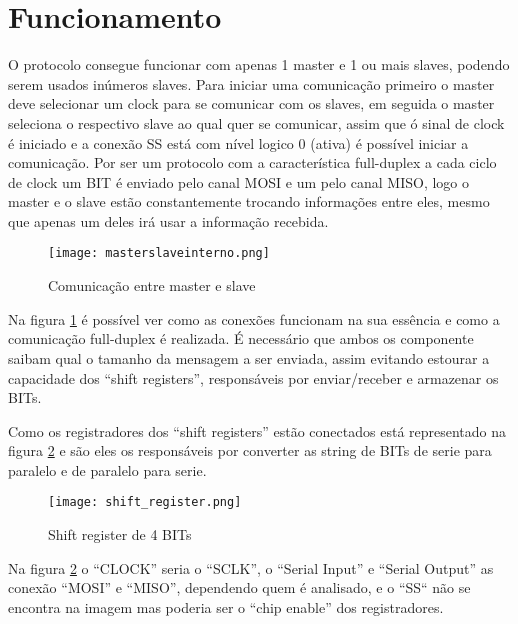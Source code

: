 \documentclass{article}
\begin{document}
    \section*{Funcionamento}
        O protocolo consegue funcionar com apenas 1 master e 1 ou mais slaves, podendo serem usados inúmeros slaves. Para iniciar uma comunicação primeiro o master deve selecionar um clock para se comunicar com os slaves, em seguida o master seleciona o respectivo slave ao qual quer se comunicar, assim que ó sinal de clock é iniciado e a conexão SS está com nível logico 0 (ativa) é possível iniciar a comunicação. Por ser um protocolo com a característica full-duplex a cada ciclo de clock um BIT é enviado pelo canal MOSI e um pelo canal MISO, logo o master e o slave estão constantemente trocando informações entre eles, mesmo que apenas um deles irá usar a informação recebida.
        \begin{figure}[H]
            \centering
            \texttt{[image: masterslaveinterno.png]}
            \caption{Comunicação entre master e slave}
            \label{fig:Comunicacao}
        \end{figure}
        Na figura \ref{fig:Comunicacao} é possível ver como as conexões funcionam na sua essência e como a comunicação full-duplex é realizada. É necessário que ambos os componente saibam qual o tamanho da mensagem a ser enviada, assim evitando estourar a capacidade dos “shift registers”, responsáveis por enviar/receber e armazenar os BITs. 
        
        Como os registradores dos “shift registers” estão conectados está representado na figura \ref{fig:shift registers} e são eles os responsáveis por converter as string de BITs de serie para paralelo e de paralelo para serie.
        \begin{figure}[H]
            \centering
            \texttt{[image: shift\_register.png]}
            \caption{Shift register de 4 BITs}
            \label{fig:shift registers}
        \end{figure}
        Na figura \ref{fig:shift registers} o “CLOCK” seria o “SCLK”, o “Serial Input” e “Serial Output” as conexão “MOSI” e “MISO”, dependendo quem é analisado, e o “SS“ não se encontra na imagem mas poderia ser o “chip enable” dos registradores.
\end{document}
